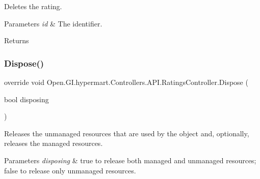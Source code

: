 Deletes the rating. 


\begin{DoxyParams}{Parameters}
{\em id} & The identifier.\\
\hline
\end{DoxyParams}
\begin{DoxyReturn}{Returns}

\end{DoxyReturn}
\hypertarget{class_open_1_1_g_i_1_1hypermart_1_1_controllers_1_1_a_p_i_1_1_ratings_controller_abb9f3f53bdc7109192217e3dc99532a7}{}\label{class_open_1_1_g_i_1_1hypermart_1_1_controllers_1_1_a_p_i_1_1_ratings_controller_abb9f3f53bdc7109192217e3dc99532a7} 
\subsubsection{\texorpdfstring{Dispose()}{Dispose()}}
{\footnotesize\ttfamily override void Open.\+G\+I.\+hypermart.\+Controllers.\+A\+P\+I.\+Ratings\+Controller.\+Dispose (\begin{DoxyParamCaption}\item[{bool}]{disposing }\end{DoxyParamCaption})\hspace{0.3cm}{\ttfamily [protected]}}



Releases the unmanaged resources that are used by the object and, optionally, releases the managed resources. 


\begin{DoxyParams}{Parameters}
{\em disposing} & true to release both managed and unmanaged resources; false to release only unmanaged resources.\\
\hline
\end{DoxyParams}
\hypertarget{class_open_1_1_g_i_1_1hypermart_1_1_controllers_1_1_a_p_i_1_1_ratings_controller_a628d4db60f8c5ea8bbf03db08ee67178}{}\label{class_open_1_1_g_i_1_1hypermart_1_1_controllers_1_1_a_p_i_1_1_ratings_controller_a628d4db60f8c5ea8bbf03db08ee67178} 
